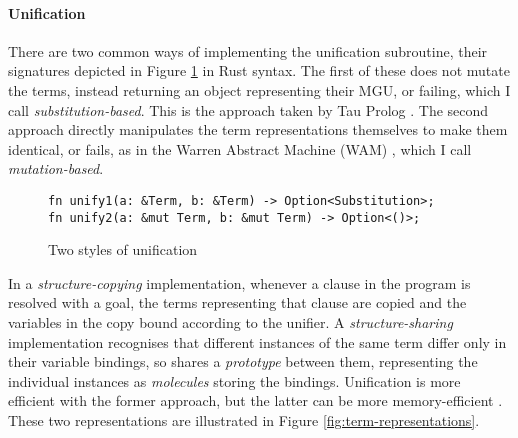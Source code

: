 \paragraph{Unification} There are two common ways of implementing the unification subroutine, their signatures depicted in Figure \ref{fig:unification-impl} in Rust syntax. The first of these does not mutate the terms, instead returning an object representing their MGU, or failing, which I call \emph{substitution-based}. This is the approach taken by Tau Prolog \cite{riazaTauPrologProlog2024}. The second approach directly manipulates the term representations themselves to make them identical, or fails, as in the Warren Abstract Machine (WAM) \cite{warrenAbstractPrologInstruction1983}, which I call \emph{mutation-based}.

\begin{figure}[H]
\centering
\begin{verbatim}
fn unify1(a: &Term, b: &Term) -> Option<Substitution>;
fn unify2(a: &mut Term, b: &mut Term) -> Option<()>;
\end{verbatim}
\caption{Two styles of unification}
\label{fig:unification-impl}
\end{figure}

In a \emph{structure-copying} implementation, whenever a clause in the program is resolved with a goal, the terms representing that clause are copied and the variables in the copy bound according to the unifier. A \emph{structure-sharing} implementation recognises that different instances of the same term differ only in their variable bindings, so shares a \emph{prototype} between them, representing the individual instances as \emph{molecules} storing the bindings. Unification is more efficient with the former approach, but the latter can be more memory-efficient \cite{linewtermrepresentation1998}. These two representations are illustrated in Figure \ref{fig:term-representations}.

